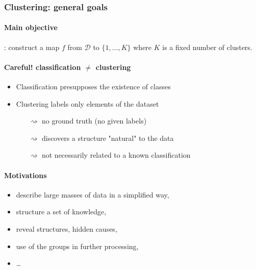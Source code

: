 \documentclass{beamer}\usepackage[]{graphicx}\usepackage[]{color}
\begin{document}
\begin{frame}[label=Clustering]
  \frametitle{Clustering: general goals}

  \paragraph{Main objective}: construct a map $f$ from $\mathcal{D}$ to $\{1,\ldots,K\}$ where $K$ is a fixed number of clusters.
    
  \vfill
    
  \paragraph{Careful! classification $\neq$ clustering}
      \begin{itemize}
      \item Classification presupposes the existence of classes
      \item Clustering labels only elements of the dataset
      \begin{itemize}
      \item[$\rightsquigarrow$] no ground truth (no given labels)
      \item[$\rightsquigarrow$] discovers a structure "natural" to the data
      \item[$\rightsquigarrow$] not necessarily related to a known classification
      \end{itemize}
      \end{itemize}
  
  \vfill

  \paragraph{Motivations}
    \begin{itemize}
    \item describe large masses of data in a simplified way,
    \item structure a set of knowledge,
    \item reveal structures, hidden causes,
    \item use of the groups in further processing, 
    \item \dots
  \end{itemize}

\end{frame}
\end{document}
